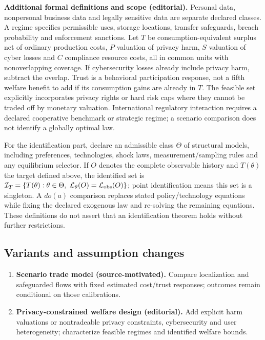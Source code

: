 \documentclass[11pt,a4paper]{article}
\begin{document}
\textbf{Additional formal definitions and scope (editorial).} Personal data, nonpersonal business data and legally sensitive data are separate declared classes. A regime specifies permissible uses, storage locations, transfer safeguards, breach probability and enforcement sanctions. Let \(T\) be consumption-equivalent surplus net of ordinary production costs, \(P\) valuation of privacy harm, \(S\) valuation of cyber losses and \(C\) compliance resource costs, all in common units with nonoverlapping coverage. If cybersecurity losses already include privacy harm, subtract the overlap. Trust is a behavioral participation response, not a fifth welfare benefit to add if its consumption gains are already in \(T\). The feasible set explicitly incorporates privacy rights or hard risk caps where they cannot be traded off by monetary valuation. International regulatory interaction requires a declared cooperative benchmark or strategic regime; a scenario comparison does not identify a globally optimal law.

For the identification part, declare an admissible class \(\Theta\) of structural models, including preferences, technologies, shock laws, measurement/sampling rules and any equilibrium selector. If \(O\) denotes the complete observable history and \(T(\theta)\) the target defined above, the identified set is \(\mathcal I_T=\{T(\theta):\theta\in\Theta,\ \mathcal L_\theta(O)=\mathcal L_{\rm obs}(O)\}\); point identification means this set is a singleton. A \(do(a)\) comparison replaces stated policy/technology equations while fixing the declared exogenous law and re-solving the remaining equations. These definitions do not assert that an identification theorem holds without further restrictions.
\subsection*{Variants and assumption changes}
\begin{enumerate}
\item \textbf{Scenario trade model (source-motivated).} Compare localization and safeguarded flows with fixed estimated cost/trust responses; outcomes remain conditional on those calibrations.
\item \textbf{Privacy-constrained welfare design (editorial).} Add explicit harm valuations or nontradeable privacy constraints, cybersecurity and user heterogeneity; characterize feasible regimes and identified welfare bounds.
\end{enumerate}
\end{document}
